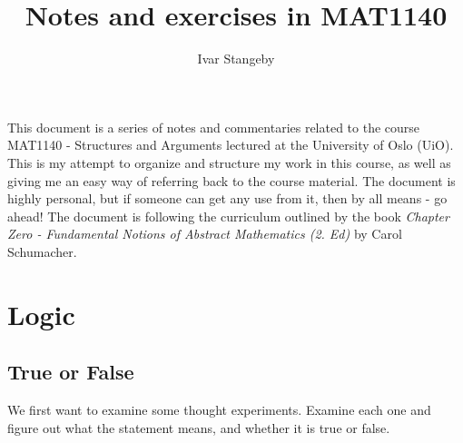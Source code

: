 \documentclass[a4paper, 11pt]{report}
\title{
  Notes and exercises in MAT1140
}
\author{
  Ivar Stangeby
}
\theoremstyle{plain}
\theoremstyle{definition}
\begin{document}
\maketitle

\abstract
This document is a series of notes and commentaries related to the course
MAT1140 - Structures and Arguments lectured at the University of Oslo (UiO).
This is my attempt to organize and structure my work in this course, as well as
giving me an easy way of referring back to the course material. The document is
highly personal, but if someone can get any use from it, then by all means - go
ahead! The document is following the curriculum outlined by the book
\textit{Chapter Zero - Fundamental Notions of Abstract Mathematics (2. Ed)}  by Carol
Schumacher.
\tableofcontents

\chapter{Logic}
\label{cha:logic}

\section{True or False}
\label{sec:true_or_false}

We first want to examine some thought experiments. Examine each one and figure
out what the statement means, and whether it is true or false.
\end{document}
